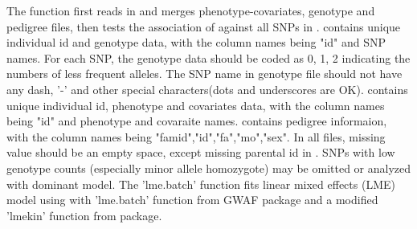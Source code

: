 \begin{Details}\relax
The  function first reads in and merges phenotype-covariates, genotype 
and pedigree files, then tests the association of  against all SNPs in .
 contains unique individual id and genotype data, with the column names being "id" and SNP names.
For each SNP, the genotype data should be coded as 0, 1, 2 indicating the numbers of less frequent 
alleles. The SNP name in genotype file should not have any 
dash, '-' and other special characters(dots and underscores are OK).  contains unique individual id, 
phenotype and covariates data, with the column names being "id" and phenotype and 
covaraite names.  contains pedigree informaion, with the column names being 
"famid","id","fa","mo","sex". In all files, missing value should be an empty space, except missing parental id in .
SNPs with low genotype counts (especially minor allele homozygote) may be omitted
or analyzed with dominant model. The 'lme.batch' function fits linear mixed effects (LME) model using  
with 'lme.batch' function from GWAF package and a modified 'lmekin' function from  package.
\end{Details}
